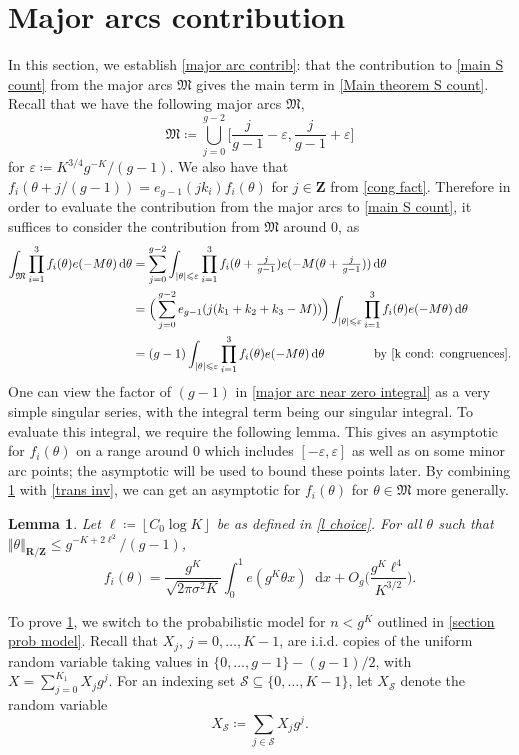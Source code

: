 \documentclass[hidelinks,11pt,reqno]{amsart}
\renewcommand{\leq}{\leqslant}
\newcommand{\Z}{\ensuremath{\mathbf{Z}}}
\newcommand{\R}{\ensuremath{\mathbf{R}}}
\newcommand*\dif{\mathop{}\!\mathrm{d}}
\newcommand{\xb}{X}
\newcommand{\Vertr}{\Vert_{\R/\Z}}
\newcommand{\ru}[1]{e_{g-1}(#1)}
\newcommand{\V}[1]{\Vert #1 \Vertr}
\newcommand{\floor}[1]{\left\lfloor #1 \right\rfloor}
\newtheorem{lemma}[prop]{Lemma}
\theoremstyle{remark}
\begin{document}
\section{Major arcs contribution}\label{Section: major arc} 
In this section, we establish \cref{major arc contrib}: that the contribution to \cref{main S count} from the major arcs $\mathfrak{M}$ gives the main term in \cref{Main theorem S count}. Recall that we have the following major arcs $\mathfrak{M}$,
\[\mathfrak{M}\coloneqq \bigcup_{j=0}^{g-2}\big[\frac{j}{g-1}-\varepsilon,\frac{j}{g-1}+\varepsilon\big ]\]
for $\varepsilon\coloneq K^{3/4}g^{-K}/(g-1)$. We also have that $f_{i}(\theta+j/(g-1))=\ru{jk_{i}}f_{i}(\theta)$ for $j\in \Z$ from \cref{cong fact}. Therefore in order to evaluate the contribution from the major arcs to \cref{main S count}, it suffices to consider the contribution from $\mathfrak{M}$ around 0, as
\begin{align}
    \int_{\mathfrak{M}}\prod_{i=1}^{3}f_{i}(\theta)e(-M\theta)\dif\theta&=\sum_{j=0}^{g-2}\int_{|\theta|\leq \varepsilon}\prod_{i=1}^{3}f_{i}(\theta+\tfrac{j}{g-1})e(-M(\theta+\tfrac{j}{g-1}))\dif\theta\nonumber \\
    &=\Big (\sum_{j=0}^{g-2}\ru{j(k_{1}+k_{2}+k_{3}-M)}\Big)\int_{|\theta|\leq \varepsilon}\prod_{i=1}^{3}f_{i}(\theta)e(-M\theta)\dif\theta \nonumber\\
    &=(g-1)\int_{|\theta|\leq \varepsilon}\prod_{i=1}^{3}f_{i}(\theta)e(-M\theta)\dif\theta \mbox{\qquad\qquad by \cref{k cond: congruences}.} \label{major arc near zero integral}
\end{align}
One can view the factor of $(g-1)$ in \cref{major arc near zero integral} as a very simple singular series, with the integral term being our singular integral. To evaluate this integral, we require the following lemma. This gives an asymptotic for $f_{i}(\theta)$ on a range around 0 which includes $[-\varepsilon,\varepsilon]$ as well as on some minor arc points; the asymptotic will be used to bound these points later. By combining \cref{major arc asymp lemma} with \cref{trans inv}, we can get an asymptotic for $f_{i}(\theta)$ for $\theta \in \mathfrak{M}$ more generally.
\begin{lemma}\label{major arc asymp lemma}
    Let $\ell\coloneqq \floor{C_{0}\log K}$ be as defined in \cref{l choice}. For all $\theta$ such that $\V{\theta}\leq g^{-K+2\ell^{2}}/(g-1)$,
    \[f_{i}(\theta)=\frac{g^{K}}{\sqrt{2\pi\sigma^{2}K}}\int_{0}^{1}e(g^{K}\theta x)\dif x+O_{g}\Big(\frac{g^{K}\ell^{4}}{K^{3/2}}\Big).\]
\end{lemma}
To prove \cref{major arc asymp lemma}, we switch to the probabilistic model for $n<g^{K}$ outlined in \cref{section prob model}. Recall that $X_{j}$, $j=0,\ldots, K-1$, are i.i.d. copies of the uniform random variable taking values in $\{0,\ldots, g-1\}-(g-1)/2$, with $\xb=\sum_{j=0}^{K_1}X_{j}g^{j}$. For an indexing set $\mathcal{S}\subseteq \{0,\ldots, K-1\}$, let $\xb_{\mathcal{S}}$ denote the random variable 
\begin{equation}\label{Xs defintion}
    \xb_{\mathcal{S}}\coloneq \sum_{j\in \mathcal{S}}X_{j}g^{j}.
    \end{equation}
\end{document}
